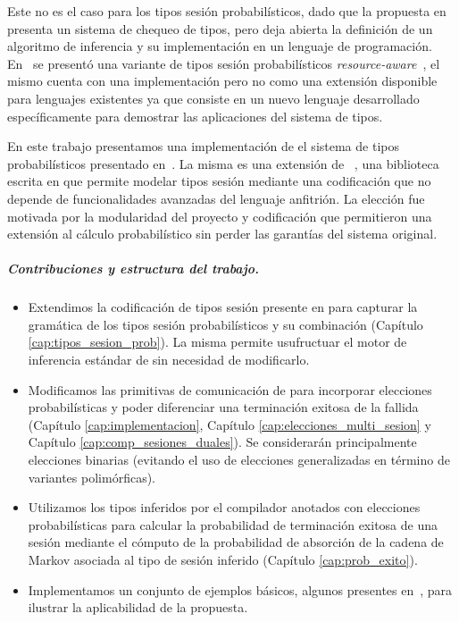 Este no es el caso para los tipos sesión probabilísticos, dado que la
propuesta en~\cite{DBLP:conf/concur/InversoMPTT20} presenta un sistema de
chequeo de tipos, pero deja abierta la definición de un algoritmo de inferencia
y su implementación en un lenguaje de programación. En~\cite{DasDH20} se
presentó una variante de tipos sesión probabilísticos
\emph{resource-aware}~\cite{DasHP18}, el mismo cuenta con una implementación
pero no como una extensión disponible para lenguajes existentes ya que consiste
en un nuevo lenguaje desarrollado específicamente para demostrar las
aplicaciones del sistema de tipos.

En este trabajo presentamos una implementación de el sistema de tipos
probabilísticos presentado en~\cite{DBLP:conf/concur/InversoMPTT20}. La misma
es una extensión de \FuSe~\cite{DBLP:journals/jfp/Padovani17}, una biblioteca
escrita en \OCaml que permite modelar tipos sesión mediante una codificación
que no depende de funcionalidades avanzadas del lenguaje anfitrión. La elección
fue motivada por la modularidad del proyecto y codificación que permitieron
una extensión al cálculo probabilístico sin perder las garantías del sistema
original.

\subparagraph*{Contribuciones y estructura del trabajo.}
\begin{itemize}

	\item Extendimos la codificación de tipos sesión presente en \FuSe para
		capturar la gramática de los tipos sesión probabilísticos y su
		combinación (Capítulo \ref{cap:tipos_sesion_prob}). La misma
		permite usufructuar el motor de inferencia estándar de \OCaml
		sin necesidad de modificarlo.

	\item Modificamos las primitivas de comunicación de \FuSe para
		incorporar elecciones probabilísticas y poder diferenciar una
		terminación exitosa de la fallida (Capítulo
		\ref{cap:implementacion}, Capítulo
		\ref{cap:elecciones_multi_sesion} y Capítulo
		\ref{cap:comp_sesiones_duales}). Se considerarán principalmente
		elecciones binarias (evitando el uso de elecciones
		generalizadas en término de variantes polimórficas).

	\item Utilizamos los tipos inferidos por el compilador anotados con
		elecciones probabilísticas para calcular la probabilidad de
		terminación exitosa de una sesión mediante el cómputo de la
		probabilidad de absorción de la cadena de Markov asociada al
		tipo de sesión inferido (Capítulo \ref{cap:prob_exito}).

	\item Implementamos un conjunto de ejemplos básicos, algunos presentes
		en~\cite{DBLP:conf/concur/InversoMPTT20}, para ilustrar la
		aplicabilidad de la propuesta.
\end{itemize}
